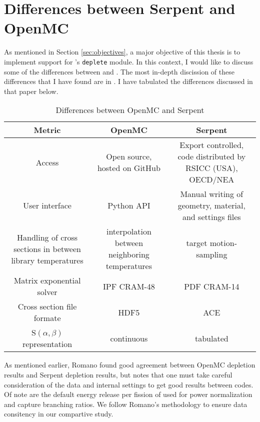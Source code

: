 \section{Differences between Serpent and OpenMC}
As mentioned in Section \ref{sec:objectives}, a major objective of this thesis
is to implement support for \OpenMC's \verb.deplete. module. In this context,
I would like to discuss some of the differences between \OpenMC and \SerpentTWO. The most in-depth discission of these differences that I have found are in \cite{romano_depletion_2021}. I have tabulated the differences discussed in that paper below.
\begin{table}[htpb] 
    \centering 
    \caption{Differences between OpenMC and Serpent} 
    \label{tab:mc_code_diffs}
    \begin{tabulary}{\linewidth}{|C|C|C|} 
        \hline
        Metric & OpenMC & Serpent \\ 
        \hline 
        Access & Open source, hosted on GitHub & Export controlled, code distributed by RSICC (USA), OECD/NEA\\
        \hline
        User interface & Python API & Manual writing of geometry, material, and settings files\\
        \hline 
        Handling of cross sections in between library temperatures & interpolation between neighboring temperatures & target motion-sampling \cite{viitanen_explicit_2012}\\
        \hline 
        Matrix exponential solver & IPF CRAM-48 & PDF CRAM-14 \\
        \hline
        Cross section file formate & HDF5 & ACE \\
        \hline
        S$(\alpha, \beta)$ representation & continuous & tabulated \\
        \hline
    \end{tabulary}
\end{table}
As mentioned earlier, Romano found good agreement between OpenMC depletion results and Serpent depletion results, but notes that one must take careful consideration of the data and internal settings to get good results between codes. Of note are the default energy release per fission of  used for power normalization and capture branching ratios. We follow Romano's methodology to ensure data consitency in our compartive study.
